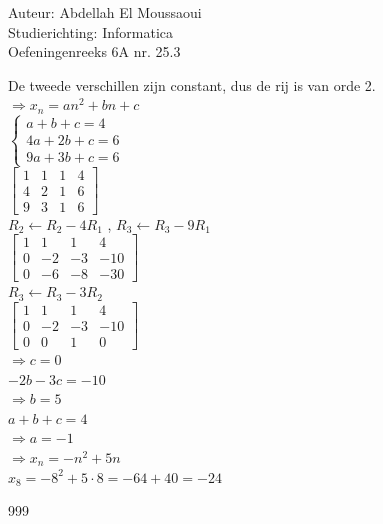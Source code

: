 \documentclass[a4paper]{article}
\begin{document}
  
\noindent \large Auteur: Abdellah El Moussaoui \\
\noindent \large Studierichting: Informatica\\
\noindent \large Oefeningenreeks 6A nr. 25.3\\

\medskip

\normalsize

De tweede verschillen zijn constant, dus de rij is van orde 2.\\

$\Rightarrow x_n=an^2+bn+c$\\

$\left\{
\begin{array}{l}
a+b+c=4\\
4a+2b+c=6\\
9a+3b+c=6
\end{array}
\right.$\\

$\left[
\begin{array}{ccc|c}
1&1&1&4\\
4&2&1&6\\
9&3&1&6
\end{array}
\right]$\\

$R_2 \leftarrow R_2-4R_1$ , $R_3 \leftarrow R_3-9R_1$\\

$\left[
\begin{array}{ccc|c}
1&1&1&4\\
0&-2&-3&-10\\
0&-6&-8&-30
\end{array}
\right]$\\

$R_3 \leftarrow R_3-3R_2$\\

$\left[
\begin{array}{ccc|c}
1&1&1&4\\
0&-2&-3&-10\\
0&0&1&0
\end{array}
\right]$\\

$\Rightarrow \boxed{c=0}$\\

$-2b-3c = -10$\\

$\Rightarrow \boxed{b=5}$\\

$a+b+c =4$\\


$\Rightarrow \boxed{a=-1}$\\

$\Rightarrow x_n = -n^2+5n$\\

$x_8 = -8^2+5\cdot8=-64+40=-24$\\

\begin{thebibliography}{999}
\end{thebibliography}
\end{document}
